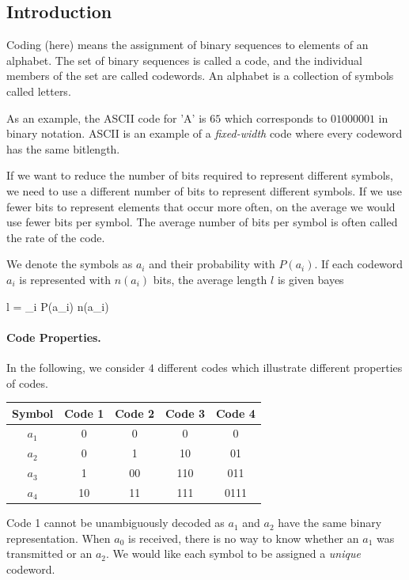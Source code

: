 
\subsection{Introduction}

Coding (here) means the assignment of binary sequences to elements of an alphabet. The set of binary sequences is called a code, and the individual members of the set are called codewords. An alphabet is a collection of symbols called letters.

As an example, the ASCII code for 'A' is $65$ which corresponds to $01000001$ in binary notation. ASCII is an example of a \emph{fixed-width} code where every codeword has the same bitlength.

If we want to reduce the number of bits required to represent different symbols, we need to use a different number of bits to represent different symbols. If we use fewer bits to represent elements that occur more often, on the average we would use fewer bits per symbol. The average number of bits per symbol is often called the rate of the code.

We denote the symbols as $a_i$ and their probability with $P(a_i)$. If each codeword $a_i$ is represented with $n(a_i)$ bits, the average length $l$ is given bayes

\bee
l = \sum_i P(a_i) n(a_i)
\eee

\paragraph{Code Properties.} In the following, we consider $4$ different codes which illustrate different properties of codes.

\vspace{3mm}

\begin{tabular}{c|cccc}
    Symbol & Code 1 & Code 2 & Code 3 & Code 4 \\ \hline
    $a_1$ & 0 & 0 & 0 & 0  \\
    $a_2$ & 0 & 1 & 10 & 01  \\
    $a_3$ & 1 & 00 & 110 & 011  \\
    $a_4$ & 10 & 11 & 111 & 0111
\end{tabular}

\vspace{3mm}

Code 1 cannot be unambiguously decoded as $a_1$ and $a_2$ have the same binary representation. When $a_0$ is received, there is no way to know whether an $a_1$ was transmitted or an $a_2$. We would like each symbol to be assigned a \emph{unique} codeword.


